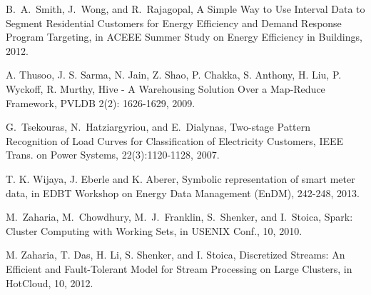 \documentclass[prodmode,acmtods]{acmsmall}
\begin{document}
\begin{thebibliography}{12}
B.~A.~Smith, J.~Wong, and R.~Rajagopal, A Simple Way to Use Interval Data to Segment Residential Customers for Energy Efficiency and Demand Response Program Targeting, in ACEEE Summer Study on Energy Efficiency in Buildings, 2012.

A. Thusoo, J. S. Sarma, N. Jain, Z. Shao, P. Chakka, S. Anthony, H. Liu, P. Wyckoff, R. Murthy, Hive - A Warehousing Solution Over a Map-Reduce Framework, PVLDB 2(2): 1626-1629, 2009.

G.~Tsekouras, N.~Hatziargyriou, and E.~Dialynas, Two-stage Pattern Recognition of Load Curves for Classification of Electricity Customers, IEEE Trans. on Power Systems, 22(3):1120-1128, 2007.

T. K. Wijaya, J. Eberle and K. Aberer, 
Symbolic representation of smart meter data, 
in EDBT Workshop on Energy Data Management (EnDM), 242-248, 2013.

M.~Zaharia, M.~Chowdhury, M.~J.~Franklin, S.~Shenker, and I.~Stoica, Spark: Cluster Computing with Working Sets, in USENIX Conf., 10, 2010.

M. Zaharia, T. Das, H. Li, S. Shenker, and I. Stoica, Discretized Streams: An Efficient and Fault-Tolerant Model for Stream Processing on Large Clusters, in HotCloud, 10, 2012.

\end{thebibliography}


%
%

\end{document}
